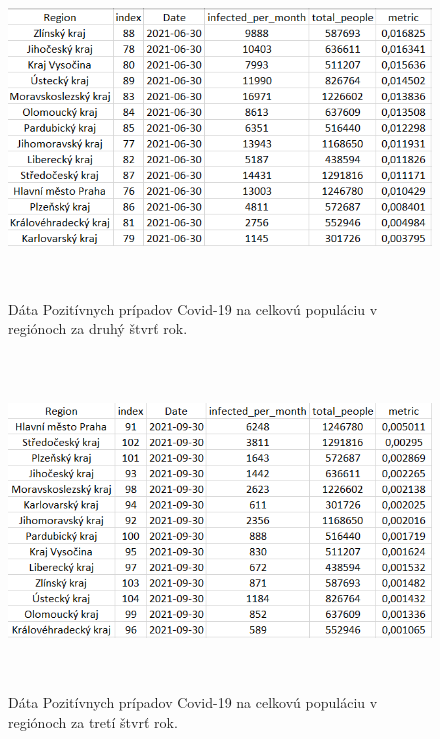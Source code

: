 \documentclass[a4paper, 16pt]{article}
\begin{document}
\begin{figure}[H] \centering
    \includegraphics[width=\linewidth,height=3.5in]{B_1.png}
    \caption{Dáta Pozitívnych prípadov Covid-19 na celkovú populáciu v regiónoch za druhý štvrť rok.}
    \label{table_1}
\end{figure}

\begin{figure}[H] \centering
    \includegraphics[width=\linewidth,height=3.5in]{B_2.png}
    \caption{Dáta Pozitívnych prípadov Covid-19 na celkovú populáciu v regiónoch za tretí štvrť rok.}
    \label{table_2}
\end{figure}
\end{document}

